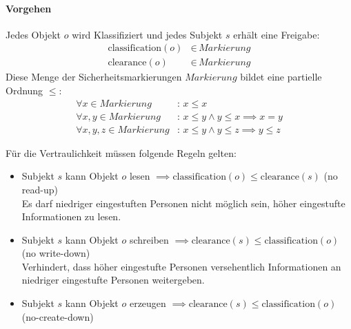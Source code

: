 \documentclass[a4paper, 11pt, accentcolor = tud3b]{tudreport}
\begin{document}
	                \paragraph{Vorgehen}
		                Jedes Objekt \(o\) wird Klassifiziert und jedes Subjekt \(s\) erhält eine Freigabe:
		                \begin{align*}
		                	\text{classification}(o) & \in\, \textit{Markierung} \\
		                	\text{clearance}(o)      & \in\, \textit{Markierung}
		                \end{align*}
		                Diese Menge der Sicherheitsmarkierungen \(\textit{Markierung}\) bildet eine partielle Ordnung \(\leq\):
		                \begin{align*}
		                	\forall x \in \textit{Markierung}       & :\, x \leq x                                  \\
		                	\forall x, y \in \textit{Markierung}    & :\, x \leq y \land y \leq x \implies x = y    \\
		                	\forall x, y, z \in \textit{Markierung} & :\, x \leq y \land y \leq z \implies y \leq z
		                \end{align*}
		                
		                Für die Vertraulichkeit müssen folgende Regeln gelten:
		                \begin{itemize}
		                	\item Subjekt \(s\) kann Objekt \(o\) lesen     \tabto{6cm} \( \implies \text{classification}(o) \leq \text{clearance}(s) \) (no read-up) \\ Es darf niedriger eingestuften Personen nicht möglich sein, höher eingestufte Informationen zu lesen.
		                	\item Subjekt \(s\) kann Objekt \(o\) schreiben \tabto{6cm} \( \implies \text{clearance}(s) \leq \text{classification}(o) \) (no write-down) \\ Verhindert, dass höher eingestufte Personen versehentlich Informationen an niedriger eingestufte Personen weitergeben.
		                	\item Subjekt \(s\) kann Objekt \(o\) erzeugen  \tabto{6cm} \( \implies \text{clearance}(s) \leq \text{classification}(o) \) (no-create-down)
		                \end{itemize}
	                
\end{document}
